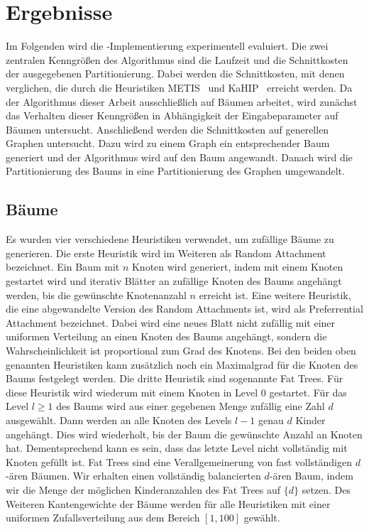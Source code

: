 
\chapter{Ergebnisse}\label{chapter:ergebnisse}
Im Folgenden wird die \Cpp\hyp Implementierung experimentell evaluiert.
Die zwei zentralen Kenngrößen des Algorithmus sind die Laufzeit und die Schnittkosten der ausgegebenen Partitionierung.
Dabei werden die Schnittkosten, mit denen verglichen, die durch die Heuristiken METIS~\cite{KK98} und KaHIP~\cite{SS13} erreicht werden.
Da der Algorithmus dieser Arbeit ausschließlich auf Bäumen arbeitet, wird zunächst das Verhalten dieser Kenngrößen in Abhängigkeit der Eingabeparameter auf Bäumen untersucht.
Anschließend werden die Schnittkosten auf generellen Graphen untersucht.
Dazu wird zu einem Graph ein entsprechender Baum generiert und der Algorithmus wird auf den Baum angewandt.
Danach wird die Partitionierung des Baums in eine Partitionierung des Graphen umgewandelt.

\section{Bäume}
Es wurden vier verschiedene Heuristiken verwendet, um zufällige Bäume zu generieren.
Die erste Heuristik wird im Weiteren als Random Attachment bezeichnet. 
Ein Baum mit $n$ Knoten wird generiert, indem mit einem Knoten gestartet wird und iterativ Blätter an zufällige Knoten des Baums angehängt werden, bis die gewünschte Knotenanzahl $n$ erreicht ist.
Eine weitere Heuristik, die eine abgewandelte Version des Random Attachments ist, wird als Preferrential Attachment bezeichnet.
Dabei wird eine neues Blatt nicht zufällig mit einer uniformen Verteilung an einen Knoten des Baums angehängt, sondern die Wahrscheinlichkeit ist proportional zum Grad des Knotens.
Bei den beiden oben genannten Heuristiken kann zusätzlich noch ein Maximalgrad für die Knoten des Baums festgelegt werden.
Die dritte Heuristik sind sogenannte Fat Trees.
Für diese Heuristik wird wiederum mit einem Knoten in Level $0$ gestartet.
Für das Level $l \geq 1$ des Baums wird aus einer gegebenen Menge zufällig eine Zahl $d$ ausgewählt.
Dann werden an alle Knoten des Levels $l - 1$ genau $d$ Kinder angehängt.
Dies wird wiederholt, bis der Baum die gewünschte Anzahl an Knoten hat. 
Dementsprechend kann es sein, dass das letzte Level nicht vollständig mit Knoten gefüllt ist.
Fat Trees sind eine Verallgemeinerung von fast vollständigen $d$\hyp ären Bäumen.
Wir erhalten einen vollständig balancierten $d$\hyp ären Baum, indem wir die Menge der möglichen Kinderanzahlen des Fat Trees auf $\{d\}$ setzen.
Des Weiteren Kantengewichte der Bäume werden für alle Heuristiken mit einer uniformen Zufallsverteilung aus dem Bereich $[1, 100]$ gewählt.

